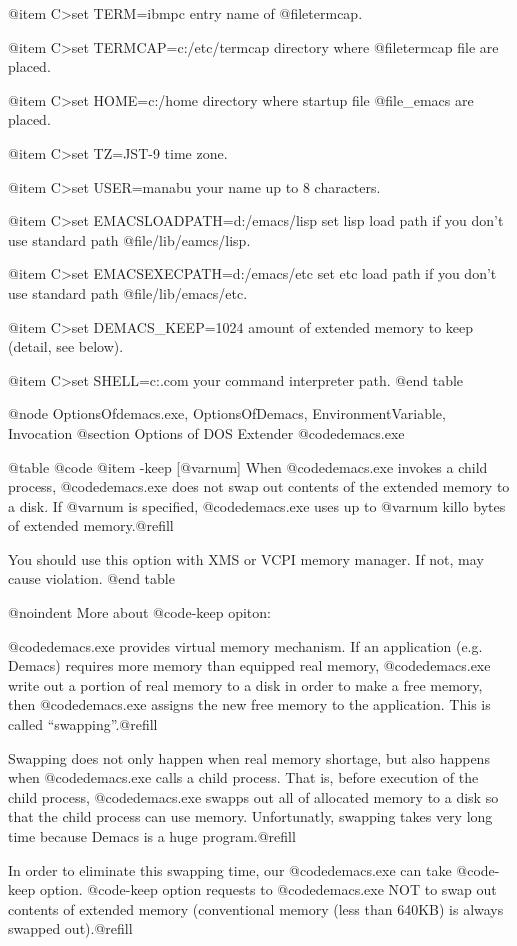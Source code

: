 @item C>set TERM=ibmpc
entry name of @file{termcap}.

@item C>set TERMCAP=c:/etc/termcap
directory where @file{termcap} file are placed.

@item C>set HOME=c:/home
directory where startup file @file{_emacs} are placed.

@item C>set TZ=JST-9
time zone.

@item C>set USER=manabu
your name up to 8 characters.

@item C>set EMACSLOADPATH=d:/emacs/lisp
set lisp load path if you don't use standard path @file{/lib/eamcs/lisp}.

@item C>set EMACSEXECPATH=d:/emacs/etc
set etc load path if you don't use standard path @file{/lib/emacs/etc}.

@item C>set DEMACS_KEEP=1024
amount of extended memory to keep (detail, see below).

@item C>set SHELL=c:\command.com
your command interpreter path.
@end table


@node OptionsOfdemacs.exe, OptionsOfDemacs, EnvironmentVariable, Invocation
@section Options of DOS Extender @code{demacs.exe}

@table @code
@item -keep [@var{num}]
When @code{demacs.exe} invokes a child process, @code{demacs.exe} does
not swap out contents of the extended memory to a disk. If @var{num} is
specified, @code{demacs.exe} uses up to @var{num} killo bytes of
extended memory.@refill

You should use this option with XMS or VCPI memory manager. If not, may
cause violation.
@end table

@noindent
More about @code{-keep} opiton:

@code{demacs.exe} provides virtual memory mechanism. If an application
(e.g. Demacs) requires more memory than equipped real memory,
@code{demacs.exe} write out a portion of real memory to a disk in order
to make a free memory, then @code{demacs.exe} assigns the new free
memory to the application. This is called ``swapping''.@refill

Swapping does not only happen when real memory shortage, but also
happens when @code{demacs.exe} calls a child process. That is, before
execution of the child process, @code{demacs.exe} swapps out all of
allocated memory to a disk so that the child process can use memory.
Unfortunatly, swapping takes very long time because Demacs is a huge
program.@refill

In order to eliminate this swapping time, our @code{demacs.exe} can take
@code{-keep} option. @code{-keep} option requests to @code{demacs.exe}
NOT to swap out contents of extended memory (conventional memory (less
than 640KB) is always swapped out).@refill

